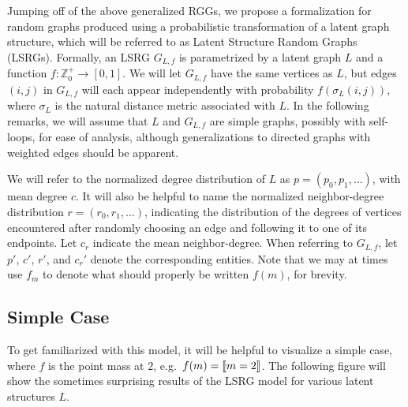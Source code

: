 \documentclass[12pt]{article}
\DeclarePairedDelimiter\iverson{\llbracket}{\rrbracket}%
\begin{document}
Jumping off of the above generalized RGGs, we propose a formalization
for random graphs produced using a probabilistic transformation
of a latent graph structure, which will be referred to as
Latent Structure Random Graphs (LSRGs). Formally, an LSRG $G_{L,f}$
is parametrized by a latent graph $L$ and a function
$f:\mathbb{Z}^+_0\to[0,1]$. We will let $G_{L,f}$ have the same vertices
as $L$, but edges $(i,j)$ in $G_{L,f}$ will each appear independently
with probability $f(\sigma_L(i, j))$, where $\sigma_L$ is the natural
distance metric associated with $L$. In the following remarks,
we will assume that $L$ and $G_{L,f}$ are simple graphs, possibly
with self-loops, for ease of analysis, although generalizations
to directed graphs with weighted edges should be apparent.\par

We will refer to the normalized degree distribution of $L$ as
$p=(p_0,p_1,\dotsc)$, with mean degree $c$. It will also be
helpful to name the normalized neighbor-degree distribution
$r=(r_0,r_1,\dotsc)$, indicating the distribution of the degrees
of vertices encountered after randomly choosing an edge and
following it to one of its endpoints. Let $c_r$ indicate the
mean neighbor-degree. When referring to $G_{L,f}$, let
$p'$, $c'$, $r'$, and $c_r'$ denote the corresponding entities.
Note that we may at times use $f_m$ to denote what should
properly be written $f(m)$, for brevity.


\subsection{\textbf{\textsf{Simple Case}}}

To get familiarized with this model, it will be helpful to
visualize a simple case, where $f$ is the point mass at 2,
e.g.\ $f(m) = \iverson{m = 2}$. The following figure will
show the sometimes surprising results of the LSRG model
for various latent structures $L$.\par
\end{document}
